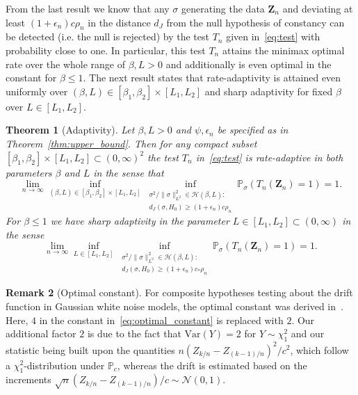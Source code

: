 \documentclass[10.5pt,letter]{article}
\numberwithin{equation}{section}
\newtheorem{theorem}{Theorem}[section]
\theoremstyle{definition}
\newtheorem{remark}[theorem]{Remark}
\renewcommand{\P}{\mathbb{P}}
\newcommand{\1}{\mathbbm{1}}
\begin{document}
From the last result we know that any $\sigma$ generating the data $\mathbf{Z}_n$ and deviating at least $(1+\epsilon_n)c\rho_n$ in the distance $d_J$ from the null hypothesis of constancy can be detected (i.e. the null is rejected) by the test $T_n$ given in~\eqref{eq:test} with probability close to one. In particular, this test $T_n$ attains the minimax optimal rate over the whole range of $\beta,L>0$ and additionally is even optimal in the constant for $\beta\leq 1$. The next result states that rate-adaptivity is attained even uniformly over $(\beta,L)\in [\beta_1,\beta_2]\times[L_1,L_2]$ and sharp adaptivity for fixed $\beta$ over $L\in [L_1,L_2]$. 



\begin{theorem}[Adaptivity]\label{thm:adaptivity}
    Let $\beta,L>0$ and $\psi,\epsilon_n$ be specified as in Theorem~\ref{thm:upper_bound}. Then for any compact subset $[\beta_1,\beta_2]\times[L_1,L_2]\subset (0,\infty)^2$ the test $T_n$ in~\eqref{eq:test} is rate-adaptive in both parameters $\beta$ and $L$ in the sense that
    \[ \lim_{n\to\infty} \inf_{(\beta,L)\in [\beta_1,\beta_2]\times[L_1,L_2]}\inf_{ \substack{\sigma^2/\|\sigma\|_{L^2}^2\in\mathcal{H}(\beta,L):\\ d_J(\sigma, H_0)\geq (1+\epsilon_n)c\rho_n}}\P_\sigma\left( T_n(\mathbf{Z}_n) =1\right)=1.\]
    For $\beta\leq 1$ we have sharp adaptivity in the parameter $L\in[L_1,L_2]\subset (0,\infty)$ in the sense
    \[ \lim_{n\to\infty} \inf_{L\in [L_1,L_2]}\inf_{ \substack{\sigma^2/\|\sigma\|_{L^2}^2\in\mathcal{H}(\beta,L):\\ d_J(\sigma, H_0)\geq (1+\epsilon_n)c_*\rho_n}}\P_\sigma\left( T_n(\mathbf{Z}_n) =1\right)=1.\]
\end{theorem}


\begin{remark}[Optimal constant]
For composite hypotheses testing about the drift function in Gaussian white noise models, the optimal constant was derived in~\cite{Dumbgen2001}. Here, $4$ in the constant in~\eqref{eq:optimal_constant} is replaced with $2$. Our additional factor $2$ is due to the fact that $\mathrm{Var}(Y)=2$ for $Y\sim\chi_1^2$ and our statistic being built upon the quantities $n(Z_{k/n}-Z_{(k-1)/n})^2/c^2$, which follow a $\chi_1^2$-distribution under $\P_c$, whereas the drift is estimated based on the increments $\sqrt{n}(Z_{k/n}-Z_{(k-1)/n})/c\sim\mathcal{N}(0,1)$.
\end{remark}
\end{document}
